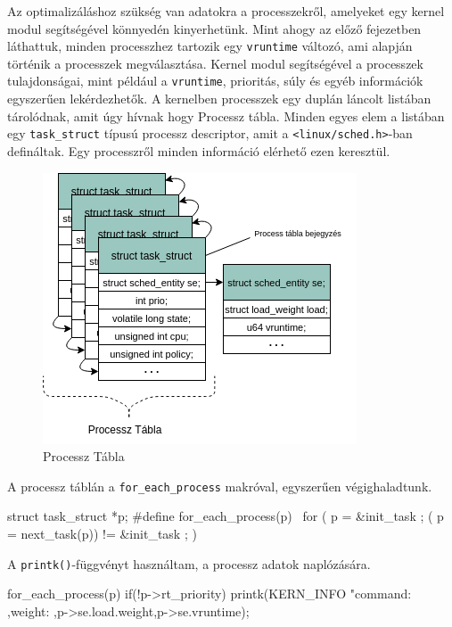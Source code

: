 

Az optimalizáláshoz szükség van adatokra a processzekről, amelyeket egy kernel modul segítségével könnyedén kinyerhetünk.
Mint ahogy az előző fejezetben láthattuk, minden processzhez tartozik egy \texttt{vruntime} változó, ami alapján történik a processzek megválasztása. 
Kernel modul segítségével a processzek tulajdonságai, mint például a \texttt{vruntime}, prioritás, súly és egyéb információk egyszerűen lekérdezhetők.
A kernelben processzek egy duplán láncolt listában tárolódnak, amit úgy hívnak hogy Processz tábla. Minden egyes elem a listában egy \texttt{task\_struct} típusú processz descriptor, amit a \texttt{<linux/sched.h>}-ban defináltak. Egy processzről minden információ elérhető ezen keresztül.

\begin{figure}[h!]
\centering
\includegraphics[scale=0.75]{images/processTable.png}
\caption{Processz Tábla}
\label{fig:structurehierarchi}
\end{figure}

\noindent A processz táblán a \texttt{for\_each\_process} makróval, egyszerűen végighaladtunk.
\begin{cpp}
struct task_struct *p;
#define for_each_process(p) \
	 for ( p = &init_task ; ( p = next_task(p)) != &init_task ; )
\end{cpp}
A \texttt{printk()}-függvényt használtam, a processz adatok naplózására.
\begin{cpp}
     for_each_process(p)
        if(!p->rt_priority)
            printk(KERN_INFO "command:%
            ,weight:%
            ,p->se.load.weight,p->se.vruntime);

\end{cpp}

